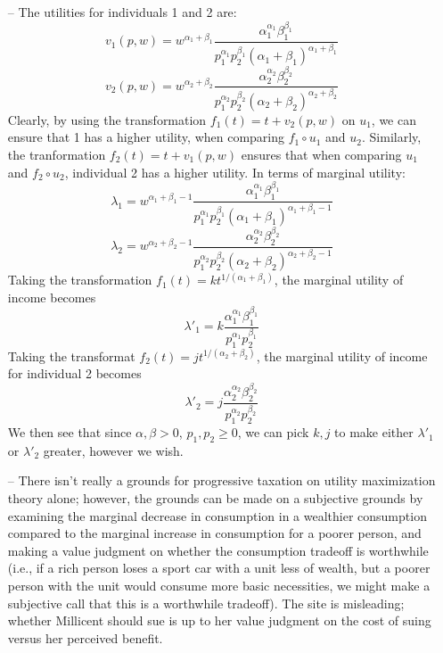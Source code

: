 \documentclass[10pt,letter]{article}
\begin{document}
\begin{itemize}
\item[--] The utilities for individuals 1 and 2 are:
\[ v_1(p,w) = w^{\alpha_1 + \beta_1}\frac{\alpha_1^{\alpha_1}\beta_1^{\beta_1} }{p_1^{\alpha_1} p_2^{\beta_1} (\alpha_1 + \beta_1)^{\alpha_1 + \beta_1}} \]
\[ v_2(p,w) = w^{\alpha_2 + \beta_2}\frac{\alpha_2^{\alpha_2}\beta_2^{\beta_2} }{p_1^{\alpha_2} p_2^{\beta_2} (\alpha_2 + \beta_2)^{\alpha_2 + \beta_2}} \]
Clearly, by using the transformation $f_1(t)= t + v_2(p,w)$ on $u_1$, we can ensure that 1 has a higher utility, when comparing $f_1 \circ u_1$ and $u_2$. Similarly, the tranformation $f_2(t) = t + v_1(p,w)$ ensures that when comparing $u_1$ and $f_2 \circ u_2$, individual 2 has a higher utility. In terms of marginal utility:
\[ \lambda_1  = w^{\alpha_1 + \beta_1 - 1}\frac{\alpha_1^{\alpha_1}\beta_1^{\beta_1} }{p_1^{\alpha_1} p_2^{\beta_1} (\alpha_1 + \beta_1)^{\alpha_1 + \beta_1 - 1}} \]
\[ \lambda_2  = w^{\alpha_2 + \beta_2 - 1}\frac{\alpha_2^{\alpha_2}\beta_2^{\beta_2} }{p_1^{\alpha_2} p_2^{\beta_2} (\alpha_2 + \beta_2)^{\alpha_2 + \beta_2 - 1}}\]
Taking the transformation $f_1(t) = k t^{1/(\alpha_1 + \beta_1)}$, the marginal utility of income becomes
\[ \lambda'_1  = k \frac{\alpha_1^{\alpha_1}\beta_1^{\beta_1} }{p_1^{\alpha_1} p_2^{\beta_1}} \]
Taking the transformat $f_2(t) = j t^{1/(\alpha_2 + \beta_2)}$, the marginal utility of income for individual 2 becomes
\[ \lambda'_2  = j \frac{\alpha_2^{\alpha_2}\beta_2^{\beta_2} }{p_1^{\alpha_2} p_2^{\beta_2}} \]
We then see that since $\alpha, \beta > 0$, $p_1, p_2 \ge 0$, we can pick $k, j$ to make either $\lambda'_1$ or $\lambda'_2$ greater, however we wish.
\item[--] There isn't really a grounds for progressive taxation on utility maximization theory alone; however, the grounds can be made on a subjective grounds by examining the marginal decrease in consumption in a wealthier consumption compared to the marginal increase in consumption for a poorer person, and making a value judgment on whether the consumption tradeoff is worthwhile (i.e., if a rich person loses a sport car with a unit less of wealth, but a poorer person with the unit would consume more basic necessities, we might make a subjective call that this is a worthwhile tradeoff). The site is misleading; whether Millicent should sue is up to her value judgment on the cost of suing versus her perceived benefit.
\end{itemize}
\end{document}
